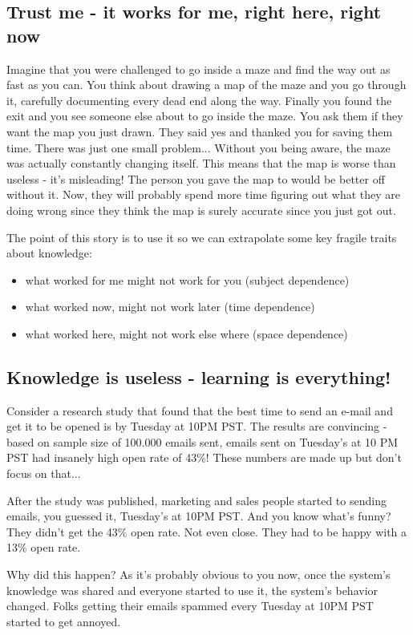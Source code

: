 \subsection{Trust me - it works for me, right here, right now}

Imagine that you were challenged to go inside a maze and find the way out as fast as you can. You think about drawing a map of the maze and you go through it, carefully documenting every dead end along the way. Finally you found the exit and you see someone else about to go inside the maze. You ask them if they want the map you just drawn. They said yes and thanked you for saving them time. There was just one small problem... Without you being aware, the maze was actually constantly changing itself. This means that the map is worse than useless - it's misleading! The person you gave the map to would be better off without it. Now, they will probably spend more time figuring out what they are doing wrong since they think the map is surely accurate since you just got out.

The point of this story is to use it so we can extrapolate some key fragile traits about knowledge: 
\begin{itemize}
	\item what worked for me might not work for you (subject dependence)
	\item  what worked now, might not work later (time dependence)
	\item  what worked here, might not work else where (space dependence)
\end{itemize}

\subsection{Knowledge is useless - learning is everything!}

Consider a research study that found that the best time to send an e-mail and get it to be opened is by Tuesday at 10PM PST. The results are convincing - based on sample size of 100.000 emails sent, emails sent on Tuesday's at 10 PM PST had insanely high open rate of 43\%! These numbers are made up but don't focus on that...

After the study was published, marketing and sales people started to sending emails, you guessed it, Tuesday's at 10PM PST. And you know what's funny? They didn't get the 43\% open rate. Not even close. They had to be happy with a 13\% open rate. 

Why did this happen? As it's probably obvious to you now, once the system's knowledge was shared and everyone started to use it, the system's behavior changed. Folks getting their emails spammed every Tuesday at 10PM PST started to get annoyed.

